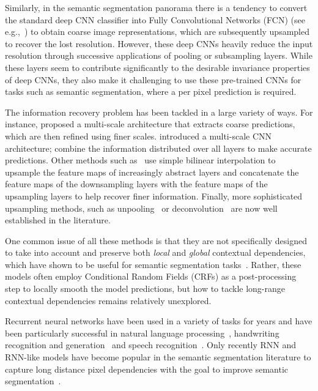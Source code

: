 Similarly, in the semantic segmentation panorama there is a tendency to convert
the standard deep CNN classifier into Fully Convolutional Networks (FCN) (see
e.g.,~\citep{long2014fully,noh2015learning, badrinarayanan2015segnet,
Ronneberger2015}) to obtain coarse image representations, which are
subsequently upsampled to recover the lost resolution. However, these deep CNNs
heavily reduce the input resolution through successive applications of pooling
or subsampling layers. While these layers seem to contribute significantly to
the desirable invariance properties of deep CNNs, they also make it challenging
to use these pre-trained CNNs for tasks such as semantic segmentation, where a
per pixel prediction is required.

The information recovery problem has been tackled in a large variety of ways.
For instance, \citep{eigen2015predicting} proposed a multi-scale architecture
that extracts coarse predictions, which are then refined using finer scales.
\cite{Farabet:2013} introduced a multi-scale CNN architecture;
\cite{Hariharan2015} combine the information distributed over all layers to
make accurate predictions. Other methods such
as~\citep{long2014fully,badrinarayanan2015segnet} use simple bilinear
interpolation to upsample the feature maps of increasingly abstract layers and
\cite{Ronneberger2015} concatenate the feature maps of the downsampling layers
with the feature maps of the upsampling layers to help recover finer
information. Finally, more sophisticated upsampling methods, such as
unpooling~\citep{noh2015learning,badrinarayanan2015segnet} or
deconvolution~\citep{long2014fully} are now well established in the literature.

One common issue of all these methods is that they are not specifically
designed to take into account and preserve both \emph{local} and \emph{global}
contextual dependencies, which have shown to be useful for semantic
segmentation tasks~\citep{Singh2013,Gatta14-deepvision}. Rather, these models
often employ Conditional Random Fields (CRFs) as a post-processing step to
locally smooth the model predictions, but how to tackle long-range contextual
dependencies remains relatively unexplored.

Recurrent neural networks have been used in a variety of tasks for years and
have been particularly successful in natural language processing~\citep[see,
e.g.,][]{Mikolov-thesis-2012,Sutskever-et-al-NIPS2014,Cho2014}, handwriting
recognition and generation~\citep[see, e.g.,][]{Graves+Schmidhuber-2009,
Graves-et-al-NIPS2007,Graves-arxiv2013} and speech recognition~\citep[see,
e.g.,][]{Chorowski-et-al-arxiv2014,Graves+Jaitly-ICML2014}. Only recently RNN
and RNN-like models have become popular in the semantic segmentation literature
to capture long distance pixel dependencies with the goal to improve semantic
segmentation~\citep{Pinheiro:2014,Gatta14-deepvision,chen2015semantic,
byeon2015scene,stollenga2015parallel}.


